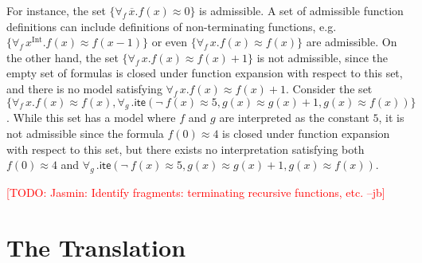\documentclass[runningheads,a4paper]{llncs}
\newcommand{\con}[1]{\mathsf{#1}}
\renewcommand\vec[1]{\overline{#1}}
\let\oldneg=\neg
\def\neg{\oldneg\:}
\newcommand{\teq}{\approx}
\newcommand{\sortint}{\mathrm{Int}}
\newcommand{\lite}{\con{ite}}
\newcommand{\forallf}[1]{\forall_{\!#1\:}}
\newcommand{\rem}[1]{\textcolor{red}{[#1]}}
\newcommand{\jb}[1]{\rem{#1 --jb}}
\begin{document}
For instance, the set $\{ \forallf{f} \vec x. f( x ) \teq 0 \}$ is admissible.
A set of admissible function definitions can include definitions of non-terminating functions, e.g.
$\{ \forallf{f} x^\sortint. f( x ) \teq f( x - 1 ) \}$ or even $\{ \forallf{f} x. f( x ) \teq f( x ) \}$ are admissible.
On the other hand, the set $\{ \forallf{f} x. f( x ) \teq f( x ) + 1 \}$ is not admissible, 
since the empty set of formulas is closed under function expansion with respect to this set,
and there is no model satisfying $\forallf{f} x. f( x ) \teq f( x ) + 1$.
Consider the set $\{ \forallf{f} x. f( x ) \teq f( x ), \forallf{g}. \lite( \neg f( x ) \teq 5, g( x ) \teq g( x ) + 1, g( x ) \teq f( x ) ) \}$.
While this set has a model where $f$ and $g$ are interpreted as the constant $5$, it is not admissible
since the formula $f( 0 ) \teq 4$ is closed under function expansion with respect to this set,
but there exists no interpretation satisfying both $f( 0 ) \teq 4$ and $\forallf{g}. \lite( \neg f( x ) \teq 5, g( x ) \teq g( x ) + 1, g( x ) \teq f( x ) )$.


\jb{TODO: Jasmin: Identify fragments: terminating recursive functions, etc.}


\section{The Translation}
\label{sec:encoding}
\end{document}
